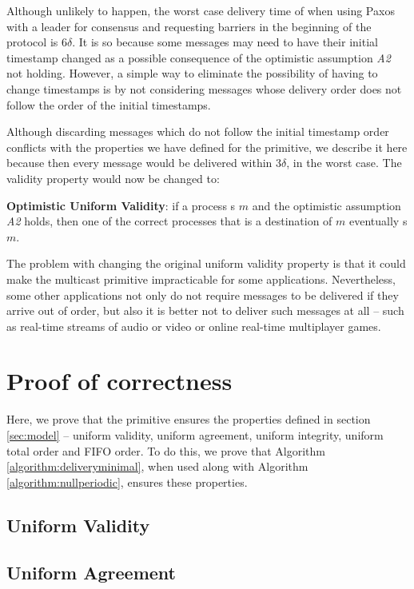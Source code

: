 \documentclass[times, 10pt]{article}
\begin{document}
Although unlikely to happen, the worst case delivery time of \amcast{} when using Paxos with a leader for consensus and requesting barriers in the beginning of the protocol is $6\delta$. It is so because some messages may need to have their initial timestamp changed as a possible consequence of the optimistic assumption \emph{A2} not holding. However, a simple way to eliminate the possibility of having to change timestamps is by not considering messages whose delivery order does not follow the order of the initial timestamps.

Although discarding messages which do not follow the initial timestamp order conflicts with the properties we have defined for the \amcast{} primitive, we describe it here because then every message would be delivered within $3\delta$, in the worst case. The validity property would now be changed to:

\textbf{Optimistic Uniform Validity}: if a process \amcast{}s $m$ and the optimistic assumption \emph{A2} holds, then one of the correct processes that is a destination of $m$ eventually \cons{}s $m$.

The problem with changing the original uniform validity property is that it could make the multicast primitive impracticable for some applications. Nevertheless, some other applications not only do not require messages to be delivered if they arrive out of order, but also it is better not to deliver such messages at all -- such as real-time streams of audio or video or online real-time multiplayer games.


\section{Proof of correctness}
\label{sec:proofs}

Here, we prove that the \amcast{} primitive ensures the properties defined in section \ref{sec:model} -- uniform validity, uniform agreement, uniform integrity, uniform total order and FIFO order. To do this, we prove that Algorithm \ref{algorithm:deliveryminimal}, when used along with Algorithm \ref{algorithm:nullperiodic}, ensures these properties.

\subsection{Uniform Validity}

\subsection{Uniform Agreement}
\end{document}
